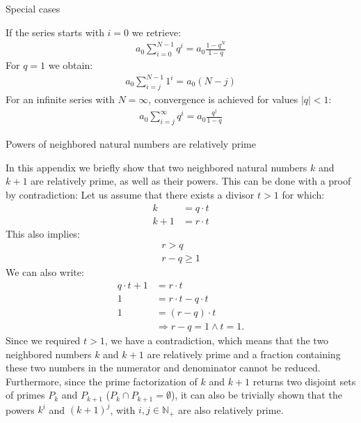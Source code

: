 \documentclass[11pt]{article}
\begin{document}
Special cases

If the series starts with $i=0$ we retrieve:
\begin{equation}
\begin{split}
a_0 \sum_{i=0}^{N-1} {q^i} = a_0 \frac{1- q^N}{1-q}
\end{split}
\label{eq:geometricSeries2a}
\end{equation}
For $q=1$ we obtain:
\begin{equation}
\begin{split}
a_0 \sum_{i=j}^{N-1} {1^i} = a_0 (N-j)
\end{split}
\label{eq:geometricSeries3}
\end{equation}
For an infinite series with $N=\infty$, convergence is achieved for values $|q|<1$:
\begin{equation}
\begin{split}
a_0 \sum_{i=j}^{\infty} {q^i} = a_0 \frac{q^j}{1-q}
\end{split}
\label{eq:geometricSeries4}
\end{equation}

Powers of neighbored natural numbers are relatively prime

In this appendix we briefly show that two neighbored natural numbers $k$ and $k+1$ are relatively prime, as well as their powers. This can be done with a proof by contradiction: 
Let us assume that there exists a divisor $t>1$ for which:
\begin{align}
k &= q \cdot t \\
k+1 &= r \cdot t
\end{align}
This also implies:
\begin{align}
r > q \\
r - q \geq 1
\end{align}
We can also write:
\begin{align}
q \cdot t + 1 &= r \cdot t \\
 1 &= r \cdot t - q \cdot t \\
 1 &= (r- q) \cdot t  \\
 & \Rightarrow r - q = 1 \wedge t = 1.
\end{align}
Since we required $t>1$, we have a contradiction, which means that the two neighbored numbers $k$ and $k+1$ are relatively prime and a fraction containing these two numbers in the numerator and denominator cannot be reduced. Furthermore, since the prime factorization of $k$ and $k+1$ returns two disjoint sets of primes $P_{k}$ and $P_{k+1}$ ($P_{k} \cap P_{k+1} = \emptyset$), it can also be trivially shown that the powers $k^i$ and $(k+1)^j$, with $i,j \in \mathbb{N_+}$ are also relatively prime.
\end{document}
